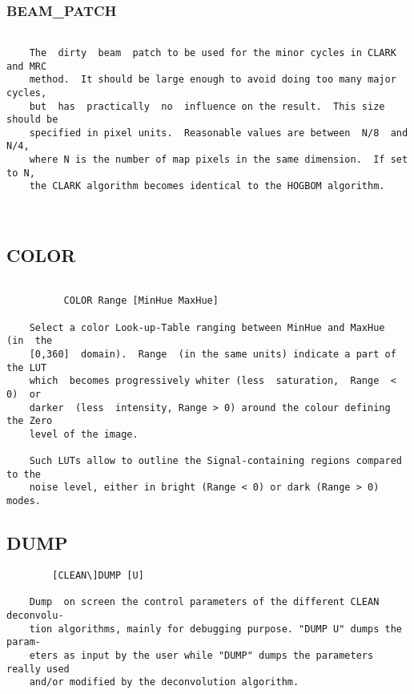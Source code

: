 \subsubsection{BEAM\_PATCH}
\begin{verbatim}

    The  dirty  beam  patch to be used for the minor cycles in CLARK and MRC
    method.  It should be large enough to avoid doing too many major cycles,
    but  has  practically  no  influence on the result.  This size should be
    specified in pixel units.  Reasonable values are between  N/8  and  N/4,
    where N is the number of map pixels in the same dimension.  If set to N,
    the CLARK algorithm becomes identical to the HOGBOM algorithm.



\end{verbatim}
\subsection{COLOR}
\begin{verbatim}

          COLOR Range [MinHue MaxHue]

    Select a color Look-up-Table ranging between MinHue and MaxHue  (in  the
    [0,360]  domain).  Range  (in the same units) indicate a part of the LUT
    which  becomes progressively whiter (less  saturation,  Range  <  0)  or
    darker  (less  intensity, Range > 0) around the colour defining the Zero
    level of the image.

    Such LUTs allow to outline the Signal-containing regions compared to the
    noise level, either in bright (Range < 0) or dark (Range > 0) modes.

\end{verbatim}
\subsection{DUMP}
\begin{verbatim}
        [CLEAN\]DUMP [U]

    Dump  on screen the control parameters of the different CLEAN deconvolu-
    tion algorithms, mainly for debugging purpose. "DUMP U" dumps the param-
    eters as input by the user while "DUMP" dumps the parameters really used
    and/or modified by the deconvolution algorithm.

\end{verbatim}
